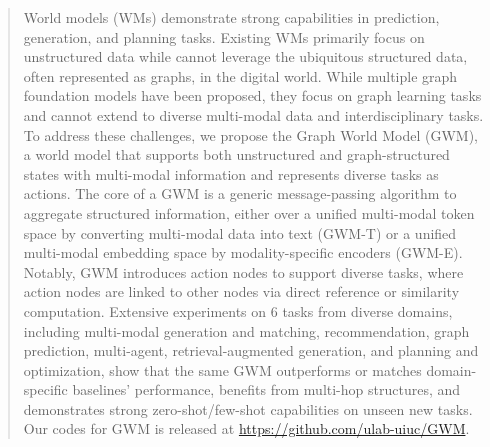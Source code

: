 \begin{abstract}

World models (WMs) demonstrate strong capabilities in prediction, generation, and planning tasks.
Existing WMs primarily focus on unstructured data while cannot leverage the ubiquitous structured data, often represented as graphs, in the digital world. While multiple graph foundation models have been proposed, they focus on graph learning tasks and cannot extend to diverse multi-modal data and interdisciplinary tasks. To address these challenges, we propose the Graph World Model (GWM), a world model that supports both unstructured and graph-structured states with multi-modal information and represents diverse tasks as actions. The core of a GWM is a generic message-passing algorithm to aggregate structured information, either over a unified multi-modal token space by converting multi-modal data into text (GWM-T) or a unified multi-modal embedding space by modality-specific encoders (GWM-E). Notably, GWM introduces action nodes to support diverse tasks, where action nodes are linked to other nodes via direct reference or similarity computation. Extensive experiments on 6 tasks from diverse domains, including multi-modal generation and matching, recommendation, graph prediction, multi-agent, retrieval-augmented generation, and planning and optimization, show that the same GWM outperforms or matches domain-specific baselines' performance, benefits from multi-hop structures, and demonstrates strong zero-shot/few-shot capabilities on unseen new tasks. Our codes for GWM is released at \url{https://github.com/ulab-uiuc/GWM}.

\end{abstract}





